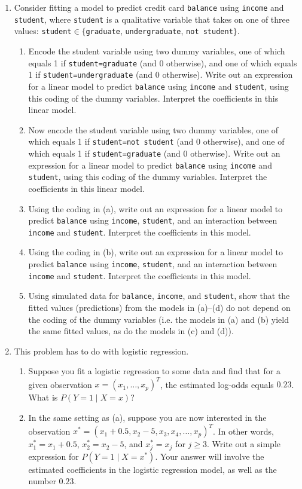 \documentclass[12pt]{article}
\begin{document}
\begin{enumerate}
\item Consider fitting a model to predict credit card \verb=balance= using \verb=income= and \verb=student=, where \verb=student= is a qualitative variable that takes on one of three values: \verb=student=$\in \{$\verb=graduate=, \verb=undergraduate=, \verb=not student=$\}$. 
\begin{enumerate}
\item Encode the student variable using two dummy variables, one of which equals 1 if \verb+student=graduate+ (and 0 otherwise), and one of which equals 1 if \verb+student=undergraduate+ (and 0 otherwise).  Write out an expression for a linear model to predict \verb=balance= using \verb=income= and \verb=student=, using this coding of the dummy variables. Interpret the coefficients in this linear model. 
\item Now encode the student variable using two dummy variables, one of which equals 1 if \verb+student=not student+ (and 0 otherwise), and one of which equals 1 if \verb+student=graduate+ (and 0 otherwise).  Write out an expression  for a linear model to predict \verb=balance= using \verb=income= and \verb=student=, using this coding of the dummy variables. Interpret the coefficients in this linear model. 
\item Using the coding in (a), write out an expression for a linear model to predict \verb=balance= using \verb=income=, \verb=student=, and an interaction between \verb=income= and \verb=student=. Interpret the coefficients in this model. 
\item Using the coding in (b), write out an expression for a linear model to predict \verb=balance= using \verb=income=, \verb=student=, and an interaction between \verb=income= and \verb=student=. Interpret the coefficients in this model. 
\item Using simulated data for \verb=balance=, \verb=income=, and \verb=student=, show that the fitted values (predictions) from the models in (a)--(d) do not depend on the coding of the dummy variables (i.e. the models in (a) and (b) yield the same fitted values, as do the models in (c) and (d)). 
\end{enumerate}


 \item  This problem has to do with logistic regression. 
 \begin{enumerate}
 \item Suppose you fit a logistic regression to some data and find that for a given observation $x=(x_1,\ldots,x_p)^T$, the estimated log-odds equals $0.23$. What is $P(Y=1 \mid X=x)$? 
 \item In the same setting as (a), suppose you are now interested in the observation $x^* = (x_1+0.5, x_2-5, x_3, x_4, \ldots, x_p)^T$. In other words, $x^*_1=x_1+0.5$, $x^*_2=x_2-5$, and $x^*_j=x_j$ for $j \geq 3$. Write out a simple expression for $P(Y=1 \mid X=x^*)$.  Your answer will involve the estimated coefficients in the logistic regression model, as well as the number $0.23$. 

\end{enumerate}
 
\end{enumerate}
\end{document}

